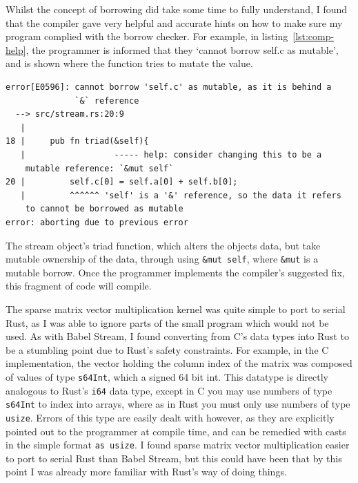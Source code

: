 Whilst the concept of borrowing did take some time to fully understand, I found that the compiler gave very helpful and accurate hints on how to make sure my program complied with the borrow checker. For example, in listing~\ref{lst:comp-help}, the programmer is informed that they `cannot borrow self.c as mutable', and is shown where the function tries to mutate the value. 

\begin{code}
\begin{verbatim}
error[E0596]: cannot borrow 'self.c' as mutable, as it is behind a
              `&` reference
  --> src/stream.rs:20:9
   |
18 |     pub fn triad(&self){
   |                  ----- help: consider changing this to be a
    mutable reference: `&mut self`
20 |         self.c[0] = self.a[0] + self.b[0];
   |         ^^^^^^ 'self' is a '&' reference, so the data it refers
    to cannot be borrowed as mutable
error: aborting due to previous error
\end{verbatim}
\label{lst:rustc-borrow}
\end{code}

The stream object's triad function, which alters the objects data, but take mutable ownership of the data, through using \texttt{\&mut self}, where \texttt{\&mut} is a mutable borrow. Once the programmer implements the compiler's suggested fix, this fragment of code will compile.

The sparse matrix vector multiplication kernel was quite simple to port to serial Rust, as I was able to ignore parts of the small program which would not be used. As with Babel Stream, I found converting from C's data types into Rust to be a stumbling point due to Rust's safety constraints. For example, in the C implementation, the vector holding the column index of the matrix was composed of values of type \texttt{s64Int}, which a signed 64 bit int. This datatype is directly analogous to Rust's \texttt{i64} data type, except in C you may use numbers of type \texttt{s64Int} to index into arrays, where as in Rust you must only use numbers of type \texttt{usize}. Errors of this type are easily dealt with however, as they are explicitly pointed out to the programmer at compile time, and can be remedied with casts in the simple format \texttt{as usize}. I found sparse matrix vector multiplication easier to port to serial Rust than Babel Stream, but this could have been that by this point I was already more familiar with Rust's way of doing things.

